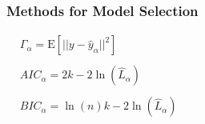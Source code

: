\documentclass[20pt,mathserif]{beamer}
\newcommand{\E}{\mathrm{E}}
\begin{document}
\begin{frame}
\frametitle{Methods for Model Selection}

\begin{align*}
&\Gamma_\alpha=\E\left[||y-\hat{y}_\alpha||^2\right]
\\\\
&AIC_\alpha = 2k - 2\ln(\hat{L}_\alpha)\hspace{30cm}
\\\\
&BIC_\alpha = \ln(n)k - 2\ln(\hat{L}_\alpha)
\end{align*}
\end{frame}
\end{document}
